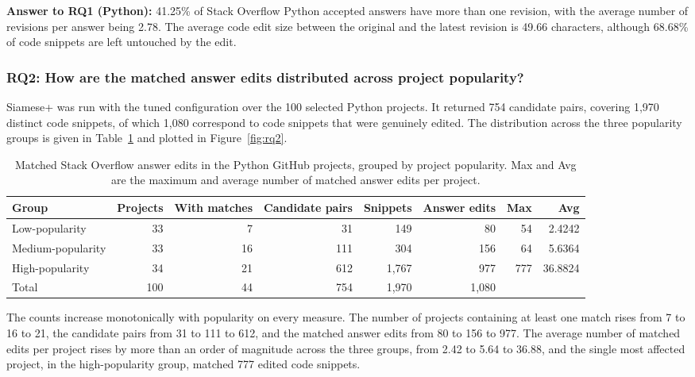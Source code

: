 \documentclass[onecolumn,11pt]{IEEEtran}
\newenvironment{rqanswer}{\par\medskip\begin{framed}\noindent}{\end{framed}\par\medskip}
\begin{document}
\begin{rqanswer}
\textbf{Answer to RQ1 (Python):} 41.25\% of Stack Overflow Python accepted answers have more than one revision, with the average number of revisions per answer being 2.78.
The average code edit size between the original and the latest revision is 49.66 characters, although 68.68\% of code snippets are left untouched by the edit.
\end{rqanswer}

\subsubsection{RQ2: How are the matched answer edits distributed across project
popularity?}

Siamese+ was run with the tuned configuration over the 100 selected Python projects.
It returned 754 candidate pairs, covering 1{,}970 distinct code snippets, of which 1{,}080 correspond to code snippets that were genuinely edited.
The distribution across the three popularity groups is given in Table~\ref{tab:rq2-python} and plotted in Figure~\ref{fig:rq2}.

\begin{table}[!t]
\caption{Matched Stack Overflow answer edits in the Python GitHub projects, grouped by
project popularity.
Max and Avg are the maximum and average number of matched answer edits per project.}
\label{tab:rq2-python}
\centering
\begin{tabular}{lrrrrrrr}
\toprule
Group & Projects & With matches & Candidate pairs & Snippets & Answer edits & Max & Avg \\
\midrule
Low-popularity    & 33 &  7 &  31 &   149 &  80 &  54 &  2.4242 \\
Medium-popularity & 33 & 16 & 111 &   304 & 156 &  64 &  5.6364 \\
High-popularity   & 34 & 21 & 612 & 1{,}767 & 977 & 777 & 36.8824 \\
\midrule
Total & 100 & 44 & 754 & 1{,}970 & 1{,}080 & & \\
\bottomrule
\end{tabular}
\end{table}

The counts increase monotonically with popularity on every measure.
The number of projects containing at least one match rises from 7 to 16 to 21, the candidate pairs from 31 to 111 to 612, and the matched answer edits from 80 to 156 to 977.
The average number of matched edits per project rises by more than an order of magnitude across the three groups, from 2.42 to 5.64 to 36.88, and the single most affected project, in the high-popularity group, matched 777 edited code snippets.
\end{document}
